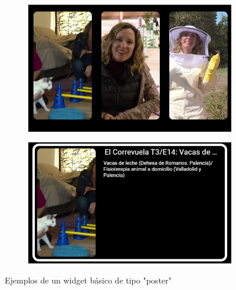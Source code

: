 \begin{figure}[H]
    \begin{subfigure}[c]{0.5\textwidth}
        \includegraphics[width=\textwidth]{imaxes/Widget_poster.png}
        \label{fig:Widget_poster}
    \end{subfigure}
    \hspace{0.1\textwidth}
    \begin{subfigure}[c]{0.5\textwidth}
        \includegraphics[width=\textwidth]{imaxes/Widget_poster_abierto.png}
        \label{fig:Widget_poster_abierto}
    \end{subfigure}
    \caption{Ejemplos de un widget básico de tipo "poster"}
    \label{fig:Widgets_poster}
\end{figure}

